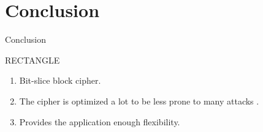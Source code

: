 \section{Conclusion}

\begin{frame}{Conclusion}

\begin{block}{RECTANGLE}
\begin{enumerate}
    \item Bit-slice block cipher.
    \item The cipher is optimized a lot to be less prone to many attacks .
    \item  Provides the application enough flexibility.   
\end{enumerate}
\end{block}

\end{frame}

